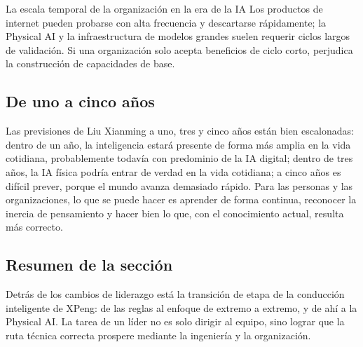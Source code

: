\begin{knowledgebox}{La escala temporal de la organización en la era de la IA}
Los productos de internet pueden probarse con alta frecuencia y descartarse rápidamente; la Physical AI y la infraestructura de modelos grandes suelen requerir ciclos largos de validación. Si una organización solo acepta beneficios de ciclo corto, perjudica la construcción de capacidades de base.
\end{knowledgebox}

\subsection{De uno a cinco años}

Las previsiones de Liu Xianming a uno, tres y cinco años están bien escalonadas: dentro de un año, la inteligencia estará presente de forma más amplia en la vida cotidiana, probablemente todavía con predominio de la IA digital; dentro de tres años, la IA física podría entrar de verdad en la vida cotidiana; a cinco años es difícil prever, porque el mundo avanza demasiado rápido. Para las personas y las organizaciones, lo que se puede hacer es aprender de forma continua, reconocer la inercia de pensamiento y hacer bien lo que, con el conocimiento actual, resulta más correcto.

\subsection{Resumen de la sección}

Detrás de los cambios de liderazgo está la transición de etapa de la conducción inteligente de XPeng: de las reglas al enfoque de extremo a extremo, y de ahí a la Physical AI. La tarea de un líder no es solo dirigir al equipo, sino lograr que la ruta técnica correcta prospere mediante la ingeniería y la organización.
